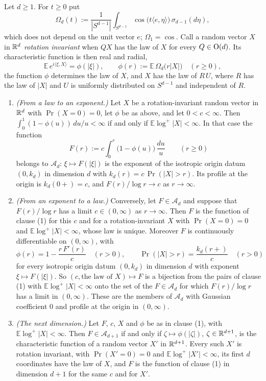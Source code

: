 \begin{proposition}\label{prop:radial-dictionary}
Let $d \ge 1$. For $t \ge 0$ put
\[
  \Omega_d(t) := \frac{1}{|S^{d-1}|}\int_{S^{d-1}}\cos\bigl(t\langle e,\eta\rangle\bigr)\,
     \sigma_{d-1}(d\eta) ,
\]
which does not depend on the unit vector $e$; $\Omega_1 = \cos$. Call a random vector $X$ in
$\mathbb{R}^d$ \emph{rotation invariant} when $QX$ has the law of $X$ for every $Q \in \mathrm{O}(d)$. Its
characteristic function is then real and radial,
\[
  \mathbb{E}\,e^{i\langle\xi,X\rangle} = \phi(|\xi|), \qquad
  \phi(r) := \mathbb{E}\,\Omega_d\bigl(r|X|\bigr) \quad (r \ge 0) ,
\]
the function $\phi$ determines the law of $X$, and $X$ has the law of $R\,U$, where $R$ has the
law of $|X|$ and $U$ is uniformly distributed on $S^{d-1}$ and independent of $R$.
\begin{enumerate}
\item \emph{(From a law to an exponent.)} Let $X$ be a rotation-invariant random vector in
$\mathbb{R}^d$ with $\Pr(X = 0) = 0$, let $\phi$ be as above, and let $0 < c < \infty$. Then
$\int_0^1 (1 - \phi(u))\,du/u < \infty$ if and only if $\mathbb{E}\log^+|X| < \infty$. In that
case the function
\[
  F(r) := c\int_0^r \bigl(1 - \phi(u)\bigr)\,\frac{du}{u} \qquad (r \ge 0)
\]
belongs to $\mathcal{A}_d$: $\xi \mapsto F(|\xi|)$ is the exponent of the isotropic origin datum
$(0,k_d)$ in dimension $d$ with $k_d(r) = c\,\Pr(|X| > r)$. Its profile at the origin is
$k_d(0{+}) = c$, and $F(r)/\log r \to c$ as $r \to \infty$.
\item \emph{(From an exponent to a law.)} Conversely, let $F \in \mathcal{A}_d$ and suppose that
$F(r)/\log r$ has a limit $c \in (0,\infty)$ as $r \to \infty$. Then $F$ is the function of
clause (1) for this $c$ and for a rotation-invariant $X$ with $\Pr(X = 0) = 0$ and
$\mathbb{E}\log^+|X| < \infty$, whose law is unique. Moreover $F$ is continuously differentiable
on $(0,\infty)$, with
\[
  \phi(r) = 1 - \frac{r\,F'(r)}{c} \quad (r > 0), \qquad
  \Pr(|X| > r) = \frac{k_d(r{+})}{c} \quad (r > 0)
\]
for every isotropic origin datum $(0,k_d)$ in dimension $d$ with exponent $\xi \mapsto F(|\xi|)$.
So $(c, \text{the law of } X) \mapsto F$ is a bijection from the pairs of clause (1) with
$\mathbb{E}\log^+|X| < \infty$ onto the set of the $F \in \mathcal{A}_d$ for which $F(r)/\log r$
has a limit in $(0,\infty)$. These are the members of $\mathcal{A}_d$ with Gaussian coefficient
$0$ and profile at the origin in $(0,\infty)$.
\item \emph{(The next dimension.)} Let $F$, $c$, $X$ and $\phi$ be as in clause (1), with
$\mathbb{E}\log^+|X| < \infty$. Then $F \in \mathcal{A}_{d+1}$ if and only if
$\zeta \mapsto \phi(|\zeta|)$, $\zeta \in \mathbb{R}^{d+1}$, is the characteristic function of a random
vector $X'$ in $\mathbb{R}^{d+1}$. Every such $X'$ is rotation invariant, with $\Pr(X' = 0) = 0$ and
$\mathbb{E}\log^+|X'| < \infty$, its first $d$ coordinates have the law of $X$, and $F$ is the
function of clause (1) in dimension $d + 1$ for the same $c$ and for $X'$.
\end{enumerate}
\end{proposition}

